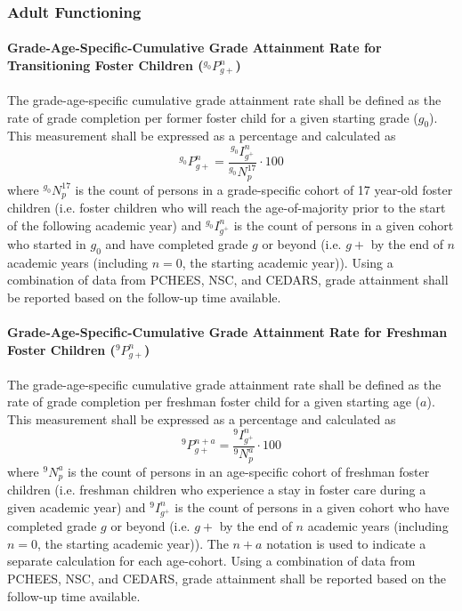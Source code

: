 \documentclass[12pt]{article}\usepackage[]{graphicx}\usepackage[]{color}
\begin{document}
\subsubsection{Adult Functioning}

\paragraph{Grade-Age-Specific-Cumulative Grade Attainment Rate for Transitioning Foster Children (${}^{g_{0}}P_{g+}^n$)}

The grade-age-specific cumulative grade attainment rate shall be defined as the rate of grade completion per former foster child for a given starting grade ($g_0$). This measurement shall be expressed as a percentage and calculated as
$$
{}^{g_{0}}P_{g+}^n=\frac{{}^{g_{0}}I^n_{g^+}}{{}^{g_0}N_p^{17}}  \cdot 100
$$
where ${}^{g_0}N_p^{17}$ is the count of persons in a grade-specific cohort of 17 year-old foster children (i.e. foster children who will reach the age-of-majority prior to the start of the following academic year) and ${}^{g_{0}}I^n_{g^+}$ is the count of persons in a given cohort who started in $g_0$ and have completed grade $g$ or beyond (i.e. $g+$ by the end of $n$ academic years (including $n=0$, the starting academic year)). Using a combination of data from PCHEES, NSC, and CEDARS, grade attainment shall be reported based on the follow-up time available.

\paragraph{Grade-Age-Specific-Cumulative Grade Attainment Rate for Freshman Foster Children (${}^{9}P_{g+}^n$)}

The grade-age-specific cumulative grade attainment rate shall be defined as the rate of grade completion per freshman foster child for a given starting age ($a$). This measurement shall be expressed as a percentage and calculated as
$$
{}^{9}P_{g+}^{n+a}=\frac{{}^{9}I^n_{g^+}}{{}^{9}N_p^{a}}  \cdot 100
$$
where ${}^{9}N_p^{a}$ is the count of persons in an age-specific cohort of freshman foster children (i.e. freshman children who experience a stay in foster care during a given academic year) and ${}^{9}I^n_{g^+}$ is the count of persons in a given cohort who have completed grade $g$ or beyond (i.e. $g+$ by the end of $n$ academic years (including $n=0$, the starting academic year)). The $n+a$ notation is used to indicate a separate calculation for each age-cohort. Using a combination of data from PCHEES, NSC, and CEDARS, grade attainment shall be reported based on the follow-up time available.
\end{document}
